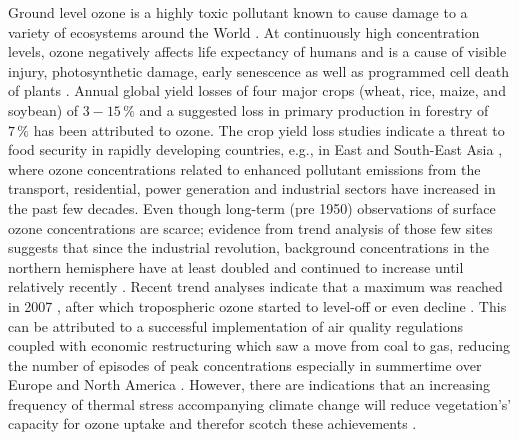 \documentclass[bg, manuscript]{copernicus}
\begin{document}
Ground level ozone is a highly toxic pollutant known to cause damage to a variety of ecosystems around the World \citep{PT:Emberson2020}. At continuously high concentration levels, ozone negatively affects life expectancy of humans \citep{WHO2008} and is a cause of visible injury, photosynthetic damage, early senescence as well as programmed cell death of plants \citep{PCE:Kangasjarvi2005}. Annual global yield losses of four major crops (wheat, rice, maize, and soybean) of $3-15\,\unit{\%}$ \citep{PJ:Ainsworth2017} and a suggested loss in primary production in forestry of $7\,\unit{\%}$ \citep{GCB:Wittig2009,EP:Matyssek2012} has been attributed to ozone.
The crop yield loss studies indicate a threat to food security in rapidly developing countries, e.g., in East and South-East Asia \citep{GCB:Tang2013,NCC:Tai2014,AE:Chuwah2015,GCB:Mills2018}, where ozone concentrations related to enhanced pollutant emissions from the transport, residential, power generation and industrial sectors have increased in the past few decades. Even though long-term (pre 1950) observations of surface ozone concentrations are scarce; evidence from trend analysis of those few sites suggests that since the industrial revolution, background concentrations in the northern hemisphere have at least doubled and continued to increase until relatively recently \citep[Chapter 2]{IPCC2013}. Recent trend analyses indicate that a maximum was reached in 2007 \citep{AE:Derwent2018}, after which tropospheric ozone started to level-off or even decline \citep{ESA:Cooper2014, ACP:Wespes2018,ESA:Gaudel2018}. This can be attributed to a successful implementation of air quality regulations coupled with economic restructuring which saw a move from coal to gas, reducing the number of episodes of peak concentrations especially in summertime over Europe and North America \citep[e.g.,][]{ESA:Fleming2018, ESA:Mills2018}. However, there are indications that an increasing frequency of thermal stress accompanying climate change will reduce vegetation's' capacity for ozone uptake and therefor scotch these achievements \citep{NCC:Lin2020}.\\
\end{document}
